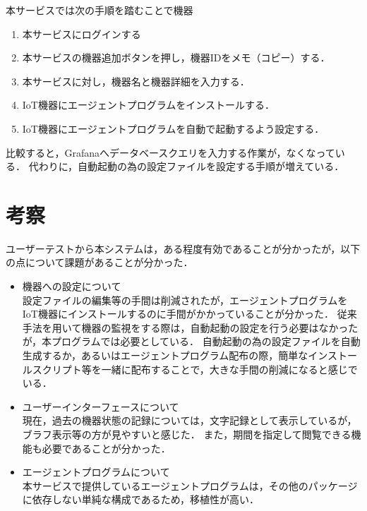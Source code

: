本サービスでは次の手順を踏むことで機器
\begin{enumerate}
\item 本サービスにログインする
\item 本サービスの機器追加ボタンを押し，機器IDをメモ（コピー）する．
\item 本サービスに対し，機器名と機器詳細を入力する．
\item IoT機器にエージェントプログラムをインストールする．
\item IoT機器にエージェントプログラムを自動で起動するよう設定する．
\end{enumerate}

比較すると，Grafanaへデータベースクエリを入力する作業が，なくなっている．
代わりに，自動起動の為の設定ファイルを設定する手順が増えている．



\section{考察}
ユーザーテストから本システムは，ある程度有効であることが分かったが，以下の点について課題があることが分かった．
\begin{itemize}
\item 機器への設定について\\
	設定ファイルの編集等の手間は削減されたが，エージェントプログラムをIoT機器にインストールするのに手間がかかっていることが分かった．
	従来手法を用いて機器の監視をする際は，自動起動の設定を行う必要はなかったが，本プログラムでは必要としている．
	自動起動の為の設定ファイルを自動生成するか，あるいはエージェントプログラム配布の際，簡単なインストールスクリプト等を一緒に配布することで，大きな手間の削減になると感じでいる．
\item ユーザーインターフェースについて\\
	現在，過去の機器状態の記録については，文字記録として表示しているが，ブラフ表示等の方が見やすいと感じた．
	また，期間を指定して閲覧できる機能も必要であることが分かった．
\item エージェントプログラムについて\\
	本サービスで提供しているエージェントプログラムは，その他のパッケージに依存しない単純な構成であるため，移植性が高い．
\end{itemize}


